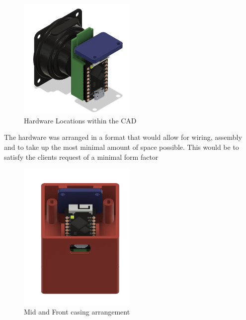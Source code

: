 {    \begin{figure}[ht!]
        \centering %
            \includegraphics[width=0.5\textwidth,keepaspectratio, angle=0]{./Images/hardware.png}
            \caption{Hardware Locations within the CAD}
        \label{fig:gantt_chart}
    \end{figure}

The hardware was arranged in a format that would allow for wiring, assembly and to take up the most minimal amount of space possible. This would be to satisfy the clients request of a minimal form factor

    \begin{figure}[ht!]
        \centering %
            \includegraphics[width=0.5\textwidth,keepaspectratio, angle=0]{./Images/interior.png}
            \caption{Mid and Front casing arrangement}
            

\end{figure}}

